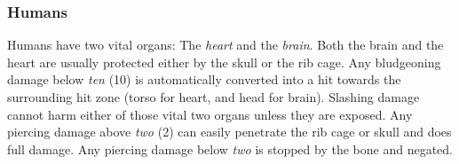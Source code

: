\subsubsection{Humans}
\label{subs:7-Humans}

Humans have two vital organs: The \emph{heart} and the \emph{brain}. Both
the brain and the heart are usually protected either by the skull or the
rib cage. Any bludgeoning damage below \emph{ten} (10) is automatically
converted into a hit towards the surrounding hit zone (torso for
heart, and head for brain). Slashing damage cannot harm either of those
vital two organs unless they are exposed. Any piercing damage above \emph{two}
(2) can easily penetrate the rib cage or skull and does full damage. Any
piercing damage below \emph{two} is stopped by the bone and negated.
